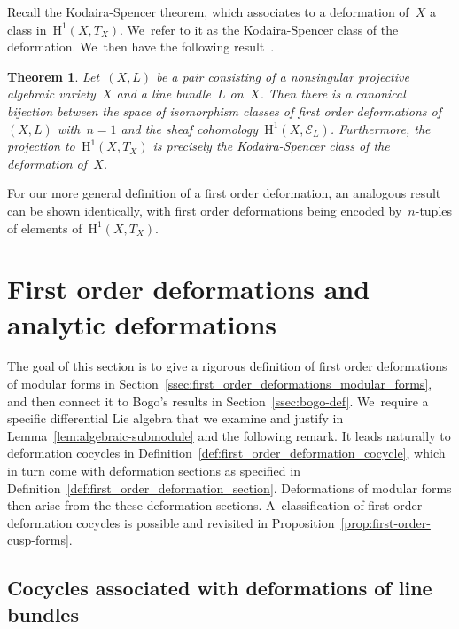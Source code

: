 \documentclass[10pt,a4paper]{article}
\numberwithin{equation}{section}
\theoremstyle{plain}
\newtheorem{theorem}[theoremcounter]{Theorem}
\theoremstyle{definition}
\newcommand{\cE}{\ensuremath{\mathcal{E}}}
\newcommand{\rmH}{\ensuremath{\mathrm{H}}}
\begin{document}
Recall the Kodaira-Spencer theorem, which associates to a deformation of~$X$ a class in~$\rmH^1(X,T_X)$. We~refer to it as the Kodaira-Spencer class of the deformation. We~then have the following result~\cite[Th.\,3.3.11]{sernesi06}.

\begin{theorem}
\label{thm:first-order-class}
Let~$(X,L)$ be a pair consisting of a nonsingular projective algebraic variety~$X$ and a line bundle~$L$ on~$X$. Then there is a canonical bijection between the space of isomorphism classes of first order deformations of~$(X,L)$ with~$n=1$ and the sheaf cohomology~$\rmH^1(X,\cE_L)$. Furthermore, the projection to~$\rmH^1(X,T_X)$ is precisely the Kodaira-Spencer class of the deformation of~$X$.
\end{theorem}

For our more general definition of a first order deformation, an analogous result can be shown identically, with first order deformations being encoded by~$n$-tuples of elements of~$\rmH^1(X,T_X)$.

\section{First order deformations and analytic deformations}
\label{sec:first-order-deformations}

The goal of this section is to give a rigorous definition of first order deformations of modular forms in Section~\ref{ssec:first_order_deformations_modular_forms}, and then connect it to Bogo's results in Section~\ref{ssec:bogo-def}. We~require a specific differential Lie algebra that we examine and justify in Lemma~\ref{lem:algebraic-submodule} and the following remark. It leads naturally to deformation cocycles in Definition~\ref{def:first_order_deformation_cocycle}, which in turn come with deformation sections as specified in Definition~\ref{def:first_order_deformation_section}. Deformations of modular forms then arise from the these deformation sections. A~classification of first order deformation cocycles is possible and revisited in Proposition~\ref{prop:first-order-cusp-forms}.

\subsection{Cocycles associated with deformations of line bundles}
\label{ssec:first_order_cocycles_line_bundle}
\end{document}
